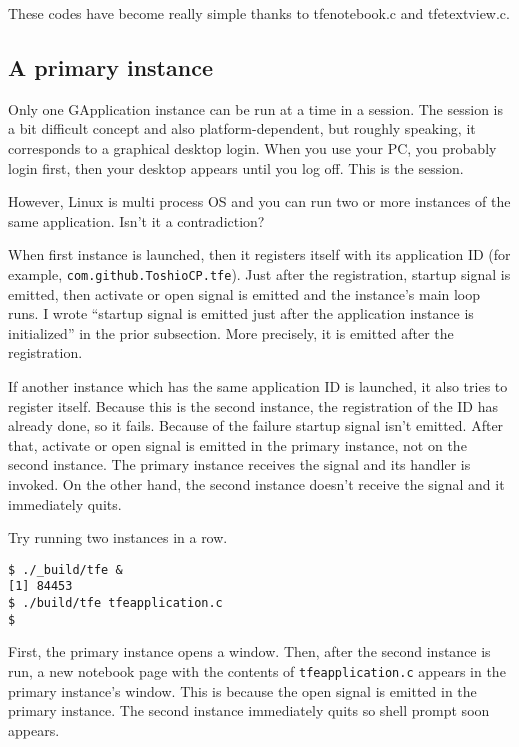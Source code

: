 These codes have become really simple thanks to tfenotebook.c and
tfetextview.c.

\subsection{A primary instance}\label{a-primary-instance}

Only one GApplication instance can be run at a time in a session. The
session is a bit difficult concept and also platform-dependent, but
roughly speaking, it corresponds to a graphical desktop login. When you
use your PC, you probably login first, then your desktop appears until
you log off. This is the session.

However, Linux is multi process OS and you can run two or more instances
of the same application. Isn't it a contradiction?

When first instance is launched, then it registers itself with its
application ID (for example,
\passthrough{\lstinline!com.github.ToshioCP.tfe!}). Just after the
registration, startup signal is emitted, then activate or open signal is
emitted and the instance's main loop runs. I wrote ``startup signal is
emitted just after the application instance is initialized'' in the
prior subsection. More precisely, it is emitted after the registration.

If another instance which has the same application ID is launched, it
also tries to register itself. Because this is the second instance, the
registration of the ID has already done, so it fails. Because of the
failure startup signal isn't emitted. After that, activate or open
signal is emitted in the primary instance, not on the second instance.
The primary instance receives the signal and its handler is invoked. On
the other hand, the second instance doesn't receive the signal and it
immediately quits.

Try running two instances in a row.

\begin{lstlisting}
$ ./_build/tfe &
[1] 84453
$ ./build/tfe tfeapplication.c
$
\end{lstlisting}

First, the primary instance opens a window. Then, after the second
instance is run, a new notebook page with the contents of
\passthrough{\lstinline!tfeapplication.c!} appears in the primary
instance's window. This is because the open signal is emitted in the
primary instance. The second instance immediately quits so shell prompt
soon appears.

